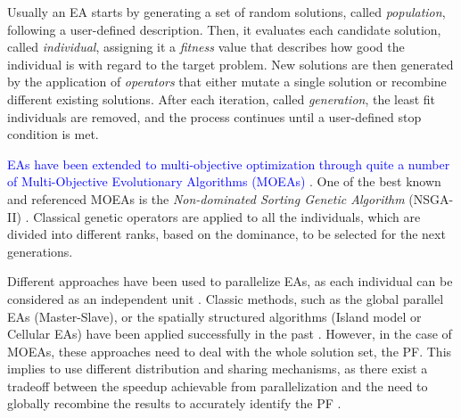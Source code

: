 \documentclass[preprint]{elsarticle}
\begin{document}

Usually an EA starts by generating a set of random solutions, called
\emph{population}, following a user-defined description. Then, it
evaluates each candidate solution, called \emph{individual}, assigning
it a \emph{fitness} value that describes how good the individual is
with regard to the target problem. New solutions are then generated by
the application of \emph{operators} that either mutate a single
solution or recombine different existing solutions. After each
iteration, called \emph{generation}, the least fit individuals are
removed, and the process continues until a user-defined stop condition
is met.

\textcolor{blue}{EAs have been extended to multi-objective optimization through quite a number of Multi-Objective Evolutionary Algorithms (MOEAs) \cite{TalbiUnified2018}}.
One of the best known and referenced MOEAs
\citep{Dorronsoro13superlinear} is the {\em 
  Non-dominated Sorting Genetic Algorithm} (NSGA-II)
\citep{Deb00NSGAII}. Classical genetic operators are applied to all
the individuals, which are divided into different ranks, based on the
dominance, to be selected for the next generations.


Different approaches have been used to parallelize EAs, as each individual can be considered as an
independent unit \citep{Alba13parallel,Gong15models}. Classic methods, such as the
global parallel EAs (Master-Slave), or the spatially structured
algorithms (Island model or Cellular EAs) have been applied
successfully in the past \citep{Folino03cellular,Alba02Parallelism}.
However, in the case of MOEAs, these
approaches \citep{Luna15Survey} need to deal with the whole solution set, the PF.
 This implies to use different distribution
and sharing mechanisms, as there exist a tradeoff between the speedup
achievable from parallelization and the need to globally recombine the
results to accurately identify the PF
\citep{Branke04Parallelizingcone}. %
\end{document}
